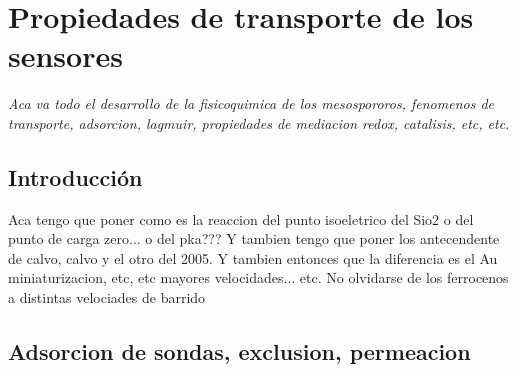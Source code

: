  \newcommand{\NoBiblioEQ}[1]{
 \ifthenelse{\equal{#1}{verdadero}}{}{}
 \NoBiblioEQ{verdadero}}


 \FormatoCapituloDosLineas
 
 \chapter{Propiedades de transporte de los sensores}
 \label{chap:Electroquimica}

 \thispagestyle{empty}
	
 \noindent\textit{Aca va todo el desarrollo de la fisicoquimica de los mesospororos, fenomenos de  transporte, adsorcion, lagmuir, propiedades de mediacion redox, catalisis, etc, etc.}

 \vfill
 \minitoc
 \newpage

\section{Introducción}

	Aca tengo que poner como es la reaccion del punto isoeletrico del Sio2 o del punto de carga zero... o del pka??? Y tambien tengo que poner los antecendente de calvo, calvo y el otro del 2005. Y tambien entonces que la diferencia es el Au miniaturizacion, etc, etc mayores velocidades... etc. 
	No olvidarse de los ferrocenos a distintas velociades de barrido

\section{Adsorcion de sondas, exclusion, permeacion}

